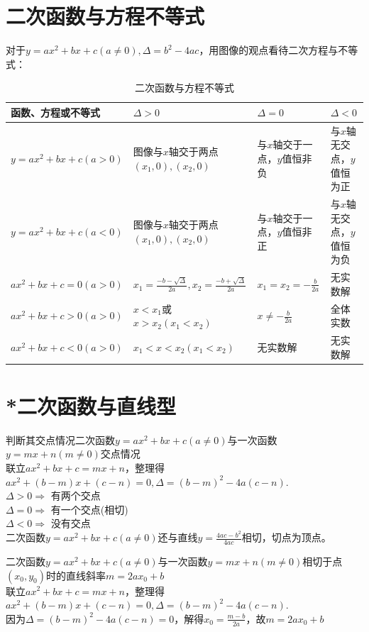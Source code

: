 \documentclass{ecnuthesis}
\begin{document}
\section{二次函数与方程不等式}
\begin{knowledge}
    对于$y=ax^2+bx+c(a\ne 0),\Delta = b^2-4ac$，用图像的观点看待二次方程与不等式：
\end{knowledge}
\begin{table}[H]
\centering
\caption{二次函数与方程不等式}
\begin{tabular}{l|p{5cm}|p{3cm}|p{2.8cm}}
\hline
\hline
函数、方程或不等式 & $\Delta > 0 $ & $\Delta = 0 $ & $\Delta < 0 $ \\
\hline
$y=ax^2+bx+c(a>0)$ & 图像与$x$轴交于两点$(x_1,0),(x_2,0)$ & 与$x$轴交于一点，$y$值恒非负 & 与$x$轴无交点，$y$值恒为正 \\
$y=ax^2+bx+c(a<0)$ & 图像与$x$轴交于两点$(x_1,0),(x_2,0)$ & 与$x$轴交于一点，$y$值恒非正 & 与$x$轴无交点，$y$值恒为负 \\
$ax^2+bx+c=0(a>0)$ & $x_1=\frac{-b-\sqrt\Delta}{2a},x_2=\frac{-b+\sqrt\Delta}{2a}$ & $x_1=x_2=-\frac{b}{2a}$ & 无实数解 \\
$ax^2+bx+c>0(a>0)$ & $x<x_1$或$x>x_2(x_1<x_2)$ & $x \ne -\frac{b}{2a}$ & 全体实数 \\
$ax^2+bx+c<0(a>0)$ & $x_1<x<x_2(x_1<x_2)$ & 无实数解 & 无实数解 \\
\hline
\hline
\end{tabular}
\end{table}
\clearpage
\section{*二次函数与直线型}
\begin{knowledge}
    判断其交点情况二次函数$y=ax^2+bx+c(a \ne 0)$与一次函数$y=mx+n(m \ne 0)$交点情况 \\
    联立$ax^2+bx+c=mx+n$，整理得$ax^2+(b-m)x+(c-n)=0,\Delta=(b-m)^2-4a(c-n)$. \\
    $\Delta > 0 \Rightarrow$ 有两个交点 \\
    $\Delta = 0 \Rightarrow$ 有一个交点(相切) \\
    $\Delta < 0 \Rightarrow$ 没有交点 \\
    二次函数$y=ax^2+bx+c(a \ne 0)$还与直线$y=\frac{4ac-b^2}{4ac}$相切，切点为顶点。
\end{knowledge}
\begin{knowledge}
    二次函数$y=ax^2+bx+c(a \ne 0)$与一次函数$y=mx+n(m \ne 0)$相切于点$(x_0,y_0)$时的直线斜率$m=2ax_0+b$ \\
    联立$ax^2+bx+c=mx+n$，整理得$ax^2+(b-m)x+(c-n)=0,\Delta=(b-m)^2-4a(c-n)$. \\
    因为$\Delta=(b-m)^2-4a(c-n)=0$，解得$x_0=\frac{m-b}{2a}$，故$m=2ax_0+b$ \\
\end{knowledge}
\clearpage
\end{document}
